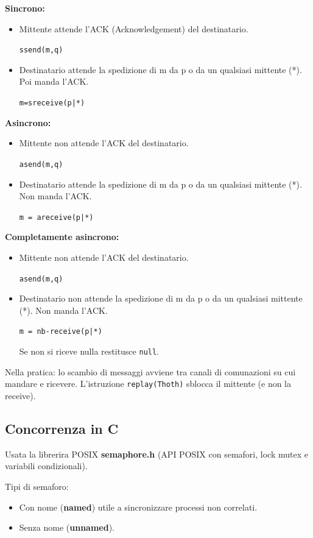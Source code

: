 \textbf{Sincrono:}
\begin{itemize}
	\item Mittente attende l'ACK (Acknowledgement) del destinatario.

	\texttt{ssend(m,q)}
	\item Destinatario attende la spedizione di m da p o da un qualsiasi mittente (*). Poi manda l'ACK.

	\texttt{m=sreceive(p|*)}
\end{itemize}

\textbf{Asincrono:}
\begin{itemize}
	\item Mittente non attende l'ACK del destinatario.

	\texttt{asend(m,q)}

	\item Destinatario attende la spedizione di m da p o da un qualsiasi mittente (*). Non manda l'ACK.

	\texttt{m = areceive(p|*)}

\end{itemize}

\textbf{Completamente asincrono:}
\begin{itemize}
	\item Mittente non attende l'ACK del destinatario.

	\texttt{asend(m,q)}
	\item Destinatario non attende la spedizione di m da p o da un qualsiasi mittente (*). Non manda l'ACK.

	\texttt{m = nb-receive(p|*)}

	 Se non si riceve nulla restitusce \texttt{null}.
\end{itemize}
Nella pratica: lo scambio di messaggi avviene tra canali di comunazioni su cui mandare e ricevere. L'istruzione \texttt{replay(Thoth)} sblocca il mittente (e non la receive).

\subsection{Concorrenza in C}
Usata la librerira POSIX  \textbf{semaphore.h} (API POSIX con semafori, lock mutex e variabili condizionali).

Tipi di semaforo:
\begin{itemize}
	\item Con nome (\textbf{named}) utile a sincronizzare processi non correlati.
	\item Senza nome (\textbf{unnamed}).
\end{itemize}

